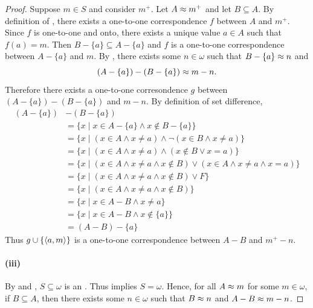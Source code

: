 \documentclass{report}
\begin{document}
\begin{proof}
      Suppose $m \in S$ and consider $m^+$.
      Let $A \approx m^+$ and let $B \subseteq A$.
      By definition of , there exists a one-to-one
        correspondence $f$ between $A$ and $m^+$.
      Since $f$ is one-to-one and onto, there exists a unique value $a \in A$
        such that $f(a) = m$.
      Then $B - \{a\} \subseteq A - \{a\}$ and $f$ is a one-to-one
        correspondence between $A - \{a\}$ and $m$.
      By , there exists some $n \in \omega$
        such that $B - \{a\} \approx n$ and
        $$(A - \{a\}) - (B - \{a\}) \approx m - n.$$
      Therefore there exists a one-to-one corresondence $g$ between
        $(A - \{a\}) - (B - \{a\})$ and $m - n$.
      By definition of set difference,
        \begin{align*}
          (A - \{a\}) & - (B - \{a\}) \\
            & = \{x \mid x \in A - \{a\} \land x \not\in B - \{a\}\} \\
            & = \{x \mid
                  (x \in A \land x \neq a) \land
                  \neg(x \in B \land x \neq a)\} \\
            & = \{x \mid
                  (x \in A \land x \neq a) \land
                  (x \not\in B \lor x = a)\} \\
            & = \{x \mid
                  (x \in A \land x \neq a \land x \not\in B) \lor
                  (x \in A \land x \neq a \land x = a)\} \\
            & = \{x \mid
                (x \in A \land x \neq a \land x \not\in B) \lor F\} \\
            & = \{x \mid (x \in A \land x \neq a \land x \not\in B)\} \\
            & = \{x \mid x \in A - B \land x \neq a\} \\
            & = \{x \mid x \in A - B \land x \not\in \{a\}\} \\
            & = (A - B) - \{a\}
        \end{align*}
      Thus $g \cup \{\left< a, m \right>\}$ is a one-to-one correspondence between
        $A - B$ and $m^+ - n$.

    \paragraph{(iii)}%

      By  and
        , $S \subseteq \omega$ is an
        .
      Thus  implies $S = \omega$.
      Hence, for all $A \approx m$ for some $m \in \omega$, if $B \subseteq A$,
        then there exists some $n \in \omega$ such that $B \approx n$ and
        $A - B \approx m - n$.

  \end{proof}
\end{document}

